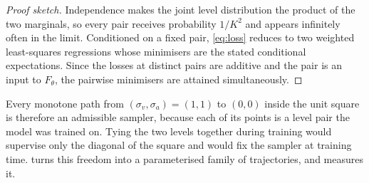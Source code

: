 \begin{proof}[Proof sketch]
Independence makes the joint level distribution the product of the two marginals,
so every pair receives probability $1/K^2$ and appears infinitely often in the
limit. Conditioned on a fixed pair, \eqref{eq:loss} reduces to two weighted
least-squares regressions whose minimisers are the stated conditional
expectations. Since the losses at distinct pairs are additive and the pair is an
input to $F_\theta$, the pairwise minimisers are attained simultaneously.
\end{proof}

Every monotone path from $(\sigma_v, \sigma_a) = (1,1)$ to $(0,0)$ inside the
unit square is therefore an admissible sampler, because each of its points is a
level pair the model was trained on. Tying the two levels together during
training would supervise only the diagonal of the square and would fix the
sampler at training time.  turns this freedom into a
parameterised family of trajectories, and  measures it.

